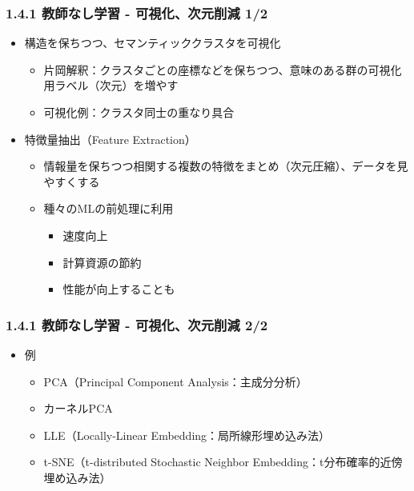\documentclass[aspectratio=169, dvipdfmx, 14pt, xcolor={svgnames,dvipsnames}]{beamer}
\def\tightlist{\itemsep1pt\parskip0pt\parsep0pt}
\begin{document}
\begin{frame}
  \frametitle{1.4.1 教師なし学習 - 可視化、次元削減 1/2}
  \begin{itemize}
    \tightlist
    \item
          構造を保ちつつ、セマンティッククラスタを可視化

          \begin{itemize}
            \tightlist
            \item
                  片岡解釈：クラスタごとの座標などを保ちつつ、意味のある群の可視化用ラベル（次元）を増やす
            \item
                  可視化例：クラスタ同士の重なり具合
          \end{itemize}
    \item
          特徴量抽出（Feature Extraction）

          \begin{itemize}
            \tightlist
            \item
                  情報量を保ちつつ相関する複数の特徴をまとめ（次元圧縮）、データを見やすくする
            \item
                  種々のMLの前処理に利用

                  \begin{itemize}
                    \tightlist
                    \item
                          速度向上
                    \item
                          計算資源の節約
                    \item
                          性能が向上することも
                  \end{itemize}
          \end{itemize}
  \end{itemize}
\end{frame}


\begin{frame}
  \frametitle{1.4.1 教師なし学習 - 可視化、次元削減 2/2}
  \begin{itemize}
    \item
          例

          \begin{itemize}
            \tightlist
            \item
                  PCA（Principal Component Analysis：主成分分析）
            \item
                  カーネルPCA
            \item
                  LLE（Locally-Linear Embedding：局所線形埋め込み法）
            \item
                  t-SNE（t-distributed Stochastic Neighbor
                  Embedding：t分布確率的近傍埋め込み法）
          \end{itemize}
  \end{itemize}
\end{frame}
\end{document}
